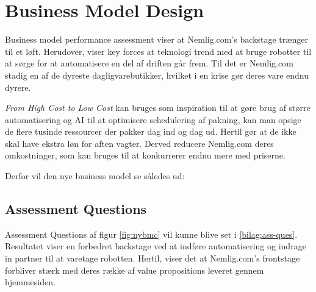 \section{Business Model Design}
Business model performance assessment viser at Nemlig.com's backstage trænger til et løft. Herudover, viser key forces at teknologi trend med at bruge robotter til at sørge for at automatisere en del af driften går frem. Til det er Nemlig.com stadig en af de dyreste dagligvarebutikker, hvilket i en krise gør deres vare endnu dyrere. 

\textit{From High Cost to Low Cost} kan bruges som inspiration til at gøre brug af større automatisering og AI til at optimisere schedulering af pakning, kan man opsige de flere tusinde ressourcer der pakker dag ind og dag ud. Hertil gør at de ikke skal have ekstra løn for aften vagter. Derved reducere Nemlig.com deres omkostninger, som kan bruges til at konkurrerer endnu mere med priserne.

Derfor vil den nye business model se således ud:

\subsection{Assessment Questions}
Assessment Questions af figur \ref{fig:nybmc} vil kunne blive set i \autoref{bilag:ass-ques}. Resultatet viser en forbedret backstage ved at indføre automatisering og indrage in partner til at varetage robotten. Hertil, viser det at Nemlig.com's frontstage forbliver stærk med deres række af value propositions leveret gennem hjemmesiden.  